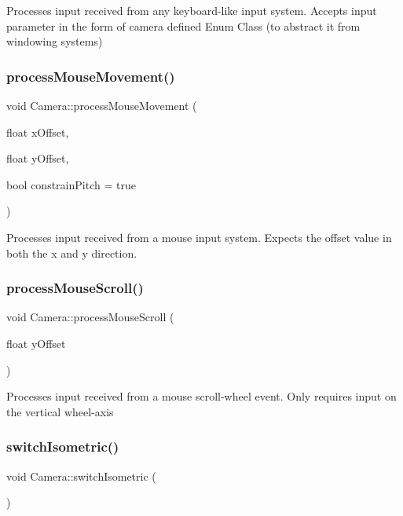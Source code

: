 Processes input received from any keyboard-\/like input system. Accepts input parameter in the form of camera defined Enum Class (to abstract it from windowing systems) 

\mbox{\label{classCamera_a4f07e3e1263c93781fb17b104d4f4c80}} 
\subsubsection{\texorpdfstring{process\+Mouse\+Movement()}{processMouseMovement()}}
{\footnotesize\ttfamily void Camera\+::process\+Mouse\+Movement (\begin{DoxyParamCaption}\item[{float}]{x\+Offset,  }\item[{float}]{y\+Offset,  }\item[{bool}]{constrain\+Pitch = {\ttfamily true} }\end{DoxyParamCaption})}

Processes input received from a mouse input system. Expects the offset value in both the x and y direction. \mbox{\label{classCamera_a067090ee525389944ba3bacaa62f7632}} 
\subsubsection{\texorpdfstring{process\+Mouse\+Scroll()}{processMouseScroll()}}
{\footnotesize\ttfamily void Camera\+::process\+Mouse\+Scroll (\begin{DoxyParamCaption}\item[{float}]{y\+Offset }\end{DoxyParamCaption})}

Processes input received from a mouse scroll-\/wheel event. Only requires input on the vertical wheel-\/axis \mbox{\label{classCamera_adcddd44d57059dd24d9bfbc6f2260778}} 
\subsubsection{\texorpdfstring{switch\+Isometric()}{switchIsometric()}}
{\footnotesize\ttfamily void Camera\+::switch\+Isometric (\begin{DoxyParamCaption}{ }\end{DoxyParamCaption})}

